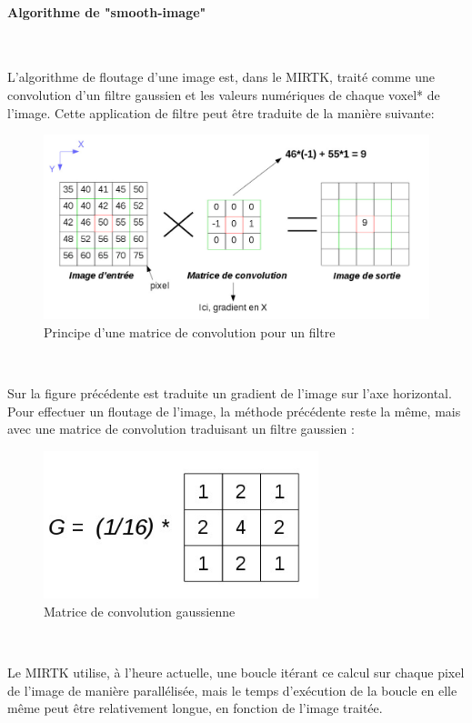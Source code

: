 \documentclass[10pt]{report}
\begin{document}
	\paragraph{Algorithme de "smooth-image"}
~\par
	L'algorithme de floutage d'une image est, dans le MIRTK, traité comme une convolution d'un filtre gaussien et les valeurs numériques de chaque voxel* de l'image. Cette application de filtre peut être traduite de la manière suivante:
	\begin{figure}[h!]
		\begin{center}
			\includegraphics[width=12cm]{convolve.jpg}
		\end{center}
		\caption{Principe d'une matrice de convolution pour un filtre}
		\label{Principe d'une matrice de convolution pour un filtre}
	\end{figure} ~\par
	Sur la figure précédente est traduite un gradient de l'image sur l'axe horizontal. Pour effectuer un floutage de l'image, la méthode précédente reste la même, mais avec une matrice de convolution traduisant un filtre gaussien :
	\begin{figure}[h!]
		\begin{center}
			\includegraphics[width=8cm]{matrix_gaussian.jpg}
		\end{center}
		\caption{Matrice de convolution gaussienne}
		\label{Matrice de convolution gaussienne}
	\end{figure} ~\par
	Le MIRTK utilise, à l'heure actuelle, une boucle itérant ce calcul sur chaque pixel de l'image de manière parallélisée, mais le temps d'exécution de la boucle en elle même peut être relativement longue, en fonction de l'image traitée. \\
\end{document}
